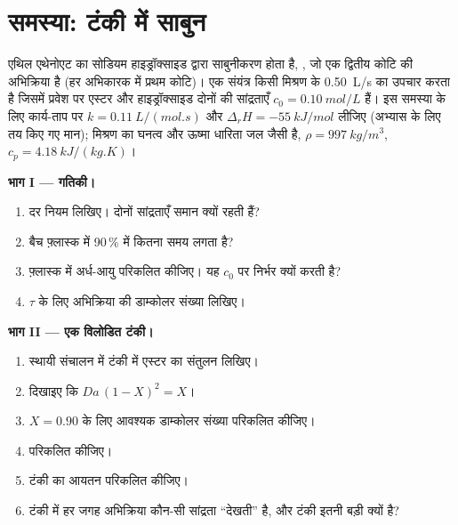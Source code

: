 \section{समस्या: टंकी में साबुन}

\begin{problem}
\label{pb:b2:continuous-reactors:1}
एथिल एथेनोएट का सोडियम हाइड्रॉक्साइड द्वारा साबुनीकरण होता है,
, जो एक द्वितीय कोटि की अभिक्रिया है (हर
अभिकारक में प्रथम कोटि)। एक संयंत्र किसी मिश्रण के \qty{0.50}{L/s} का उपचार करता है जिसमें
प्रवेश पर एस्टर और हाइड्रॉक्साइड दोनों की सांद्रताएँ $c_0 =
\qty{0.10}{mol/L}$ हैं। इस समस्या के लिए कार्य-ताप पर $k = \qty{0.11}{L/(mol.s)}$
और $\Delta_r H = \qty{-55}{kJ/mol}$ लीजिए (अभ्यास के लिए तय किए गए
मान); मिश्रण का घनत्व और ऊष्मा धारिता जल जैसी है,
$\rho = \qty{997}{kg/m^3}$, $c_p = \qty{4.18}{kJ/(kg.K)}$।

\medskip
\noindent\textbf{भाग I --- गतिकी।}
\begin{enumerate}
  \item दर नियम लिखिए। दोनों सांद्रताएँ समान क्यों रहती हैं?
  \item बैच फ़्लास्क में 90\,\%  में कितना समय लगता है?
  \item फ़्लास्क में अर्ध-आयु परिकलित कीजिए। यह $c_0$ पर निर्भर क्यों करती है?
  \item {} $\tau$ के लिए अभिक्रिया की डाम्कोलर संख्या लिखिए।
\end{enumerate}

\medskip
\noindent\textbf{भाग II --- एक विलोडित टंकी।}
\begin{enumerate}[resume]
  \item स्थायी संचालन में टंकी में एस्टर का संतुलन लिखिए।
  \item दिखाइए कि $Da\,(1 - X)^2 = X$।
  \item $X = 0.90$ के लिए आवश्यक डाम्कोलर संख्या परिकलित कीजिए।
  \item {} परिकलित कीजिए।
  \item टंकी का आयतन परिकलित कीजिए।
  \item टंकी में हर जगह अभिक्रिया कौन-सी सांद्रता ``देखती'' है,
        और टंकी इतनी बड़ी क्यों है?
\end{enumerate}


\end{problem}

